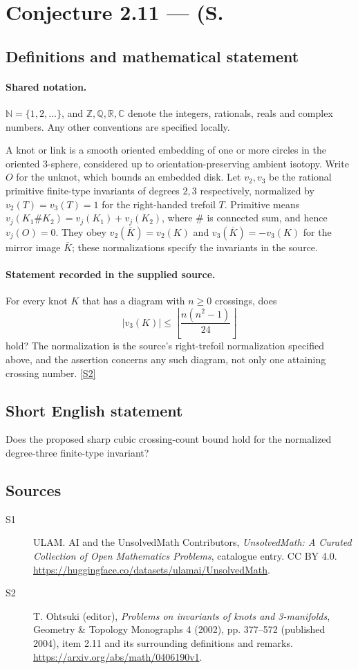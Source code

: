 \documentclass[11pt]{article}
\newcommand{\sref}[2]{\hyperlink{source:#1:#2}{[S#2]}}
\begin{document}
\section{Conjecture 2.11 — (S.}\label{statement}

\subsection{Definitions and mathematical statement}

\paragraph{Shared notation.}$\mathbb N=\{1,2,\ldots\}$, and $\mathbb Z,\mathbb Q,\mathbb R,\mathbb C$ denote the integers, rationals, reals and complex numbers. Any other conventions are specified locally.


A knot or link is a smooth oriented embedding of one or more circles in the oriented $3$-sphere, considered up to orientation-preserving ambient isotopy. Write $O$ for the unknot, which bounds an embedded disk. Let $v_2,v_3$ be the rational primitive finite-type invariants of degrees $2,3$ respectively, normalized by $v_2(T)=v_3(T)=1$ for the right-handed trefoil $T$. Primitive means $v_j(K_1\#K_2)=v_j(K_1)+v_j(K_2)$, where $\#$ is connected sum, and hence $v_j(O)=0$. They obey $v_2(\overline K)=v_2(K)$ and $v_3(\overline K)=-v_3(K)$ for the mirror image $\overline K$; these normalizations specify the invariants in the source.
\paragraph{Statement recorded in the supplied source.}
For every knot $K$ that has a diagram with $n\ge0$ crossings, does
\[|v_3(K)|\le\left\lfloor\frac{n(n^2-1)}{24}\right\rfloor\]
hold? The normalization is the source's right-trefoil normalization specified above, and the assertion concerns any such diagram, not only one attaining crossing number. \sref{statement}{2}
\subsection{Short English statement}
Does the proposed sharp cubic crossing-count bound hold for the normalized degree-three finite-type invariant?
\subsection{Sources}
\begin{description}
\item[\hypertarget{source:statement:1}{S1}] ULAM. AI and the UnsolvedMath Contributors, \emph{UnsolvedMath: A Curated Collection of Open Mathematics Problems}, catalogue entry. CC BY 4.0. \url{https://huggingface.co/datasets/ulamai/UnsolvedMath}.
\item[\hypertarget{source:statement:2}{S2}] T. Ohtsuki (editor), \emph{Problems on invariants of knots and 3-manifolds}, Geometry \& Topology Monographs 4 (2002), pp. 377--572 (published 2004), item 2.11 and its surrounding definitions and remarks. \url{https://arxiv.org/abs/math/0406190v1}.
\end{description}
\label{end:statement}
\end{document}

